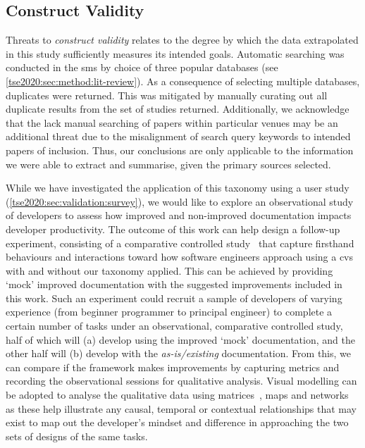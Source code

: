 \subsection{Construct Validity}

Threats to \textit{construct validity} relates to the degree by which the data extrapolated in this study sufficiently measures its intended goals. Automatic searching was conducted in the \gls{sms} by choice of three popular databases (see \cref{tse2020:sec:method:lit-review}). As a consequence of selecting multiple databases, duplicates were returned. This was mitigated by manually curating out all duplicate results from the set of studies returned. Additionally, we acknowledge that the lack manual searching of papers within particular venues may be an additional threat due to the misalignment of search query keywords to intended papers of inclusion. Thus, our conclusions are only applicable to the information we were able to extract and summarise, given the primary sources selected.

While we have investigated the application of this taxonomy using a user study (\cref{tse2020:sec:validation:survey}), we would like to explore an observational study of developers to assess how improved and non-improved  documentation impacts developer productivity. The outcome of this work can help design a follow-up experiment, consisting of a comparative controlled study~\citep{Seaman:2007wa} that capture firsthand behaviours and interactions toward how software engineers approach using a \gls{cvs} with and without our taxonomy applied. This can be achieved by providing `mock' improved documentation with the suggested improvements included in this work. Such an experiment could recruit a sample of developers of varying experience (from beginner programmer to principal engineer) to complete a certain number of tasks under an observational, comparative controlled study, half of which will (a) develop using the improved `mock' documentation, and the other half will (b) develop with the \textit{as-is/existing} documentation. From this, we can compare if the framework makes improvements by capturing metrics and recording the observational sessions for qualitative analysis. Visual modelling can be adopted to analyse the qualitative data using matrices~\citep{Dey:2003ty}, maps and networks~\citep{Miles:1994ty} as these help illustrate any causal, temporal or contextual relationships that may exist to map out the developer's mindset and difference in approaching the two sets of designs of the same tasks.


